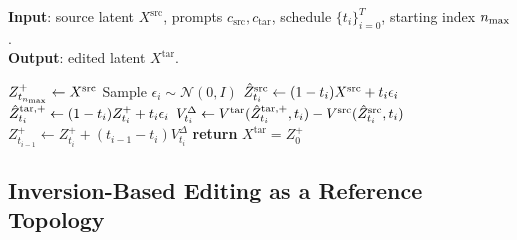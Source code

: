 \begin{algorithm}[t]
    \caption{\textbf{Simplified algorithm for \methodplus}}
    \label{alg:EchoEditPlus}
    \textbf{Input}: source latent $X^{\mathrm{src}}$, prompts $c_{\mathrm{src}},c_{\mathrm{tar}}$, schedule $\{t_i\}_{i=0}^{T}$, starting index $n_{\max}$.\\
    \textbf{Output}: edited latent $X^{\mathrm{tar}}$.
    \begin{algorithmic}[1]
    \State $Z^{+}_{t_{n_{\max}}} \leftarrow X^{\mathrm{src}}$
        \State Sample $\epsilon_i\sim\mathcal{N}(0,I)$
        \State $\hat{Z}^{\mathrm{src}}_{t_i}\leftarrow (1-t_i)X^{\mathrm{src}}+t_i\epsilon_i$
        \State $\hat{Z}^{\mathrm{tar},+}_{t_i}\leftarrow (1-t_i)Z^{+}_{t_i}+t_i\epsilon_i$
        \State $V^{\Delta}_{t_i}\leftarrow
        V^{\mathrm{tar}}(\hat{Z}^{\mathrm{tar},+}_{t_i},t_i)
        -
        V^{\mathrm{src}}(\hat{Z}^{\mathrm{src}}_{t_i},t_i)$
        \State $Z^{+}_{t_{i-1}}\leftarrow Z^{+}_{t_i}+(t_{i-1}-t_i)V^{\Delta}_{t_i}$
    \EndFor
    \State \textbf{return} $X^{\mathrm{tar}}=Z^{+}_{0}$
    \end{algorithmic}
\end{algorithm}

\subsection{Inversion-Based Editing as a Reference Topology}
\label{sec:inversion_audio}

